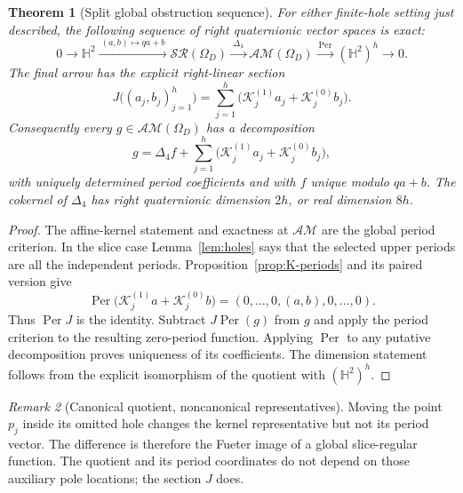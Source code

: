 \documentclass[11pt,a4paper]{article}
\numberwithin{equation}{section}
\newtheorem{theorem}{Theorem}[section]
\theoremstyle{definition}
\theoremstyle{remark}
\newtheorem{remark}[theorem]{Remark}
\newcommand{\HH}{\mathbb H}
\newcommand{\SR}{\mathcal{SR}}
\newcommand{\AM}{\mathcal{AM}}
\newcommand{\lap}{\Delta_4}
\newcommand{\Per}{\operatorname{Per}}
\begin{document}
\begin{theorem}[Split global obstruction sequence]\label{thm:split}
For either finite-hole setting just described, the following sequence of
right quaternionic vector spaces is exact:
\begin{equation}\label{eq:exact-sequence}
 0\longrightarrow\HH^2
 \xrightarrow{\ (a,b)\mapsto qa+b\ }\SR(\Omega_D)
 \xrightarrow{\ \lap\ }\AM(\Omega_D)
 \xrightarrow{\ \Per\ }(\HH^2)^h\longrightarrow0.
\end{equation}
The final arrow has the explicit right-linear section
\begin{equation}\label{eq:section-J}
 J\bigl((a_j,b_j)_{j=1}^h\bigr)
   =\sum_{j=1}^h\bigl(\mathcal K_j^{(1)}a_j+
                       \mathcal K_j^{(0)}b_j\bigr).
\end{equation}
Consequently every $g\in\AM(\Omega_D)$ has a decomposition
\begin{equation}\label{eq:normal-form}
 g=\lap f+\sum_{j=1}^h
      \bigl(\mathcal K_j^{(1)}a_j+\mathcal K_j^{(0)}b_j\bigr),
\end{equation}
with uniquely determined period coefficients and with $f$ unique modulo
$qa+b$. The cokernel of $\lap$ has right quaternionic dimension $2h$, or real
dimension $8h$.
\end{theorem}
\begin{proof}
The affine-kernel statement and exactness at $\AM$ are the global period
criterion. In the slice case Lemma~\ref{lem:holes} says that the selected upper
periods are all the independent periods. Proposition~\ref{prop:K-periods} and
its paired version give
\[
 \Per\bigl(\mathcal K_j^{(1)}a+\mathcal K_j^{(0)}b\bigr)
   =(0,\ldots,0,(a,b),0,\ldots,0).
\]
Thus $\Per J$ is the identity. Subtract $J\Per(g)$ from $g$ and apply the
period criterion to the resulting zero-period function. Applying $\Per$ to
any putative decomposition proves uniqueness of its coefficients. The
dimension statement follows from the explicit isomorphism of the quotient
with $(\HH^2)^h$.
\end{proof}

\begin{remark}[Canonical quotient, noncanonical representatives]
Moving the point $p_j$ inside its omitted hole changes the kernel representative
but not its period vector. The difference is therefore the Fueter image of a
global slice-regular function. The quotient and its period coordinates do not
depend on those auxiliary pole locations; the section $J$ does.
\end{remark}
\end{document}
